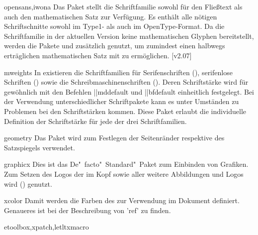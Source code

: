 \begin{packages}
\item[opensans,iwona]
  Das Paket  stellt die Schriftfamilie \OpenSans sowohl für 
  den Fließtext als auch den mathematischen Satz zur Verfügung. Es enthält alle 
  nötigen Schriftschnitte sowohl im Type1- als auch im OpenType-Format. Da die 
  Schriftfamilie in der aktuellen Version keine mathematischen Glyphen 
  bereitstellt, werden die Pakete  und  
  zusätzlich genutzt, um zumindest einen halbwegs erträglichen mathematischen 
  Satz mit \OpenSans zu ermöglichen. 
  [v2.07]
\item[mweights]
  In  existieren die Schriftfamilien für Serifenschriften 
  (), serifenlose Schriften () sowie die 
  Schreibmaschinenschriften (). Deren Schriftstärke wird für 
  gewöhnlich mit den Befehlen \Macro||{mddefault} und \Macro||{bfdefault} 
  einheitlich festgelegt. Bei der Verwendung unterschiedlicher Schriftpakete 
  kann es unter Umständen zu Problemen bei den Schriftstärken kommen. Diese 
  Paket erlaubt die individuelle Definition der Schriftstärke für jede der drei 
  Schriftfamilien.
\item[geometry]
  Das Paket wird zum Festlegen der Seitenränder respektive des Satzspiegels 
  verwendet.
\item[graphicx]
  Dies ist das De"~facto"~Standard"~Paket zum Einbinden von Grafiken. Zum 
  Setzen des Logos der \TnUD im Kopf sowie aller weitere Abbildungen und Logos 
  wird () genutzt.
\item[xcolor]
  Damit werden die Farben des \CDs zur Verwendung im Dokument definiert. 
  Genaueres ist bei der Beschreibung von 'ref' zu finden. 
\item[etoolbox,xpatch,letltxmacro]

\end{packages}
